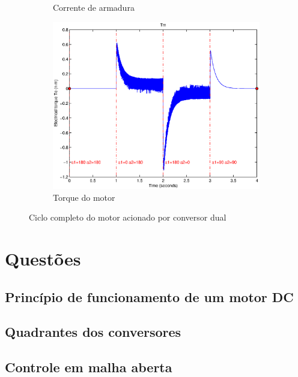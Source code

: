 \documentclass{article}
\begin{document}
\begin{figure}[H]
\begin{subfigure}[b]{0.49\linewidth}
		\caption{Corrente de armadura}
	\end{subfigure}
	\begin{subfigure}[b]{0.49\linewidth}
		\centering
		\includegraphics[width=\linewidth]{matlab/tm8}
		\caption{Torque do motor}
	\end{subfigure}
	\caption{Ciclo completo do motor acionado por conversor dual}
	\label{fig:res8}
\end{figure}
\section{Questões}
\subsection{Princípio de funcionamento de um motor DC}
\subsection{Quadrantes dos conversores}
\subsection{Controle em malha aberta}

\end{document}
